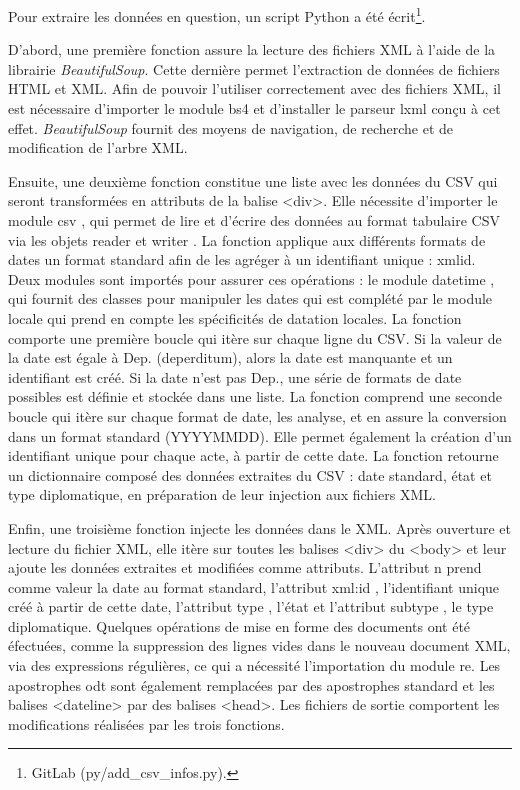 \par Pour extraire les données en question, un script Python a été écrit\footnote{GitLab (py/add\_csv\_infos.py).}. 
\newline 
\par D'abord, une première fonction assure la lecture des fichiers XML à l'aide de la librairie \textit{BeautifulSoup}. Cette dernière permet l’extraction de données de fichiers HTML et XML. Afin de pouvoir l’utiliser correctement avec des fichiers XML, il est nécessaire d'importer le module \og bs4 \fg \space et d'installer le parseur \og lxml \fg \space conçu à cet effet. \textit{BeautifulSoup} fournit des moyens de navigation, de recherche et de modification de l’arbre XML. 
\newline 
\par Ensuite, une deuxième fonction constitue une liste avec les données du CSV qui seront transformées en attributs de la balise <div>. Elle nécessite d'importer le module \og csv \fg, qui permet de lire et d'écrire des données au format tabulaire CSV via les objets \og reader \fg \space et \og writer \fg. La fonction applique aux différents formats de dates un format standard afin de les agréger à un identifiant unique : xmlid. Deux modules sont importés pour assurer ces opérations : le module \og datetime \fg, qui fournit des classes pour manipuler les dates qui est complété par le module \og locale \fg \space qui prend en compte les spécificités de datation locales. La fonction comporte une première boucle qui itère sur chaque ligne du CSV. Si la valeur de la date est égale à \og Dep. \fg \space (deperditum), alors la date est manquante et un identifiant est créé. Si la date n’est pas \og Dep.\fg, une série de formats de date possibles est définie et stockée dans une liste. La fonction comprend une seconde boucle qui itère sur chaque format de date, les analyse, et en assure la conversion dans un format standard (YYYYMMDD). Elle permet également la création d'un identifiant unique pour chaque acte, à partir de cette date. La fonction retourne un dictionnaire composé des données extraites du CSV : date standard, état et type diplomatique, en préparation de leur injection aux fichiers XML. 
\newline 
\par Enfin, une troisième fonction injecte les données dans le XML. Après ouverture et lecture du fichier XML, elle itère sur toutes les balises <div> du <body> et leur ajoute les données extraites et modifiées comme attributs. L'attribut \og n \fg \space prend comme valeur la date au format standard, l'attribut \og xml:id \fg, l'identifiant unique créé à partir de cette date, l'attribut \og type \fg, l'état et l'attribut \og subtype \fg, le type diplomatique. Quelques opérations de mise en forme des documents ont été éfectuées, comme la suppression des lignes vides dans le nouveau document XML, via des expressions régulières, ce qui a nécessité l'importation du module \og re\fg. Les apostrophes odt sont également remplacées par des apostrophes standard et les balises <dateline> par des balises <head>. Les fichiers de sortie comportent les modifications réalisées par les trois fonctions. 
\newpage 

